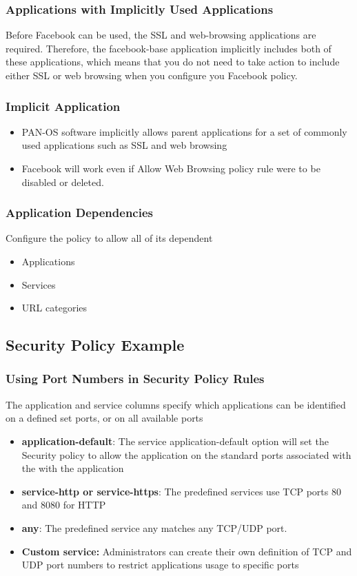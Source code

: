 \subsubsection{Applications with Implicitly Used Applications}
Before Facebook can be used, the SSL and web-browsing applications are required. Therefore, the facebook-base application implicitly includes both of these applications, which means that you do not need to take action to include either SSL or web browsing when you configure you Facebook policy.

\subsubsection{Implicit Application}
    \begin{itemize}
        \item PAN-OS software implicitly allows parent applications for a set of commonly used applications such as SSL and web browsing
        \item Facebook will work even if Allow Web Browsing policy rule were to be disabled or deleted.
    \end{itemize}
\subsubsection{Application Dependencies}
Configure the policy to allow all of its dependent
    \begin{itemize}
        \item Applications
        \item Services
        \item URL categories
    \end{itemize}

\subsection{Security Policy Example}
\subsubsection{Using Port Numbers in Security Policy Rules}
The application and service columns specify which applications can be identified on a defined set ports, or on all available ports
    \begin{itemize}
        \item \textbf{application-default}:  The service application-default option will set the Security policy to allow the application on the standard ports associated with the with the application
        \item \textbf{service-http or service-https}:  The predefined services use TCP ports 80 and 8080 for HTTP
        \item \textbf{any}:  The predefined service any matches any TCP/UDP port.
        \item \textbf{Custom service:}  Administrators can create their own definition of TCP and UDP port numbers to restrict applications usage to specific ports
    \end{itemize}

